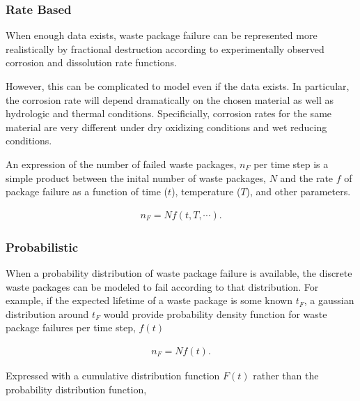 \subsubsection{Rate Based} 

When enough data exists, waste package failure can
be represented more  realistically by fractional destruction according to
experimentally observed corrosion and dissolution rate functions.

However, this can be complicated to model even if the data exists. In
particular, the corrosion rate will depend dramatically on the chosen material 
as well as hydrologic and
thermal conditions. Specificially, corrosion rates for the same material are
very different under dry oxidizing conditions and wet reducing conditions. 


An expression of the number of failed waste packages, $n_F$ per time step is a simple 
product between the inital number of waste packages, $N$ and the rate $f$ of
package  failure as a function of time ($t$), temperature ($T$), and other 
parameters.

\begin{align}
  n_F = Nf(t,T,\cdots).
  \label{rate}
\end{align}

\subsubsection{Probabilistic}

When a probability distribution of waste package failure is available, the 
discrete waste packages can be modeled to fail according to that distribution. 
For example, if the expected lifetime of a waste package is some known $t_F$, a 
gaussian distribution around $t_F$ would provide probability density function 
for waste package failures per time step, $f(t)$

\begin{align}
  n_F=Nf(t).
  \label{probabilistic}
\end{align}

Expressed with a cumulative distribution function $F(t)$ rather than the
probability distribution function, 


